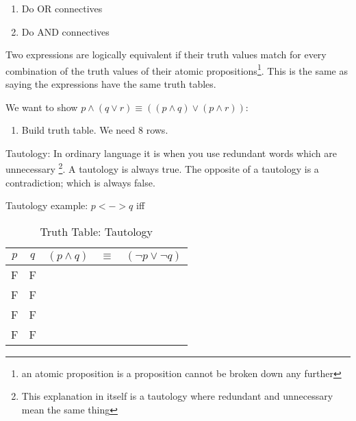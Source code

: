 \begin{enumerate}
  \item Do OR connectives
  \item Do AND connectives
\end{enumerate}


Two expressions are logically equivalent if their truth values match for every
combination of the truth values of their atomic propositions\footnote{an atomic
proposition is a proposition cannot be broken down any further}. This is the
same as saying the expressions have the same truth tables.

We want to show $p \land (q \lor r) \equiv ( (p \land q) \lor (p \land r) )$:
\begin{enumerate}
  \item Build truth table. We need 8 rows.
\end{enumerate}

Tautology: In ordinary language it is when you use redundant words which are
unnecessary \footnote{This explanation in itself is a tautology where redundant
and unnecessary mean the same thing}. A tautology is always true. The opposite
of a tautology is a contradiction; which is always false.

Tautology example: $p <-> q $ iff 

\begin{table}[!htb]
\label{tab:TruthTableTautology}
\begin{tabularx}{\linewidth}{| c | c | c | c | X |} \hline
  $p$ & $q$ & $(p \land q) $ & $ \equiv $ & $ (\lnot p \lor \lnot q) $
                                                      \\ \hline \hline
   F  &  F  &               &       &                 \\ \hline
   F  &  F  &               &       &                 \\ \hline
   F  &  F  &               &       &                 \\ \hline
   F  &  F  &               &       &                 \\ \hline
\end{tabularx}
\caption{Truth Table: Tautology}
\end{table}